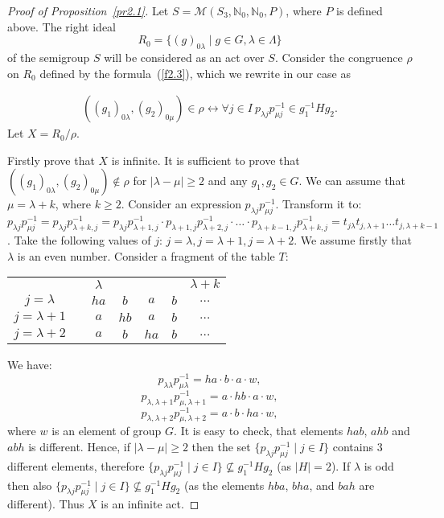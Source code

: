 \documentclass{birkau}
\numberwithin{equation}{section}
\theoremstyle{plain}
\theoremstyle{definition}
\begin{document}
\begin{proof}[Proof of Proposition~\ref{pr2.1}]
    	Let $S = \mathcal{M}(S_3,\mathbb{N}_0,\mathbb{N}_0,P)$, where $P$ is defined above. The right ideal $$ R_0 = \{ (g)_{0 \lambda} \mid g \in G, \lambda \in \Lambda \} $$ of the semigroup $S$ will be considered as an act over $S$. Consider the congruence $\rho$ on $R_0$ defined by the formula~(\ref{f2.3}), which we rewrite in our case as
    	
    	\begin{gather*}
    		((g_1)_{0 \lambda},(g_2)_{0 \mu}) \in \rho \leftrightarrow \forall j \in I \ p_{\lambda j} p_{\mu j}^{-1} \in g_1^{-1} H g_2. \label{f2.4}
    	\end{gather*}
    	Let $X = {R_0}/{\rho}$.
	
	    Firstly prove that $X$ is infinite. It is sufficient to prove that \newline  $((g_1)_{0 \lambda},(g_2)_{0 \mu}) \notin \rho$ for $|\lambda - \mu| \geqslant 2$ and any $g_1,g_2 \in G$. We can assume that $\mu = \lambda + k$, where $k \geqslant 2$. Consider an expression $p_{\lambda j} p_{\mu j}^{-1}$. Transform it to: $p_{\lambda j} p_{\mu j}^{-1} = p_{\lambda j} p_{\lambda + k, j}^{-1} = p_{\lambda j} p_{\lambda + 1, j}^{-1} \cdot p_{\lambda + 1,j} p_{\lambda + 2,j}^{-1} \cdot \ldots \cdot p_{\lambda + k - 1,j} p_{\lambda + k,j}^{-1} = t_{j \lambda}t_{j,\lambda+1} \ldots t_{j, \lambda + k - 1}$. Take the following values of $j$: $j = \lambda, j = \lambda + 1, j = \lambda + 2$. We assume firstly that $\lambda$ is an even number. Consider a fragment of the table $T$:
		\begin{center}
			\begin{tabular}{ccccccc}
					& & $\lambda$ & & & & $\lambda + k $ \\
				$j = \lambda$ & & $ha$ & $b$ & $a$ & $b$ & $\dots$ \\
				$j = \lambda+1$ & & $a$ & $hb$ & $a$ & $b$ & $\dots$ \\
				$j = \lambda+2$ & & $a$ & $b$ & $ha$ & $b$ & $\dots$
			\end{tabular}
		\end{center}
		
		We have: $$p_{\lambda \lambda} p_{\mu \lambda}^{-1} = ha \cdot b \cdot a \cdot w,$$ $$p_{\lambda, \lambda+1} p_{\mu, \lambda+1}^{-1} =a \cdot hb \cdot a \cdot w,$$ $$p_{\lambda, \lambda+2} p_{\mu, \lambda+2}^{-1} =a \cdot b \cdot ha \cdot w,$$ where $w$ is an element of group $G$. It is easy to check, that elements $hab$, $ahb$ and $abh$ is different. Hence, if $|\lambda - \mu| \geqslant 2$ then the set $\{ p_{\lambda j} p_{\mu j}^{-1} \mid j \in I \}$ contains 3 different elements, therefore $\{ p_{\lambda j} p_{\mu j}^{-1} \mid j \in I \} \not \subseteq g^{-1}_1 H g_2$ (as $|H|=2$). If $\lambda$ is odd then also $\{ p_{\lambda j} p_{\mu j}^{-1} \mid j \in I \} \not \subseteq g_1^{-1} H g_2$ (as the elements $hba$, $bha$, and $bah$ are different). Thus $X$ is an infinite act.
		

\end{proof}
\end{document}
